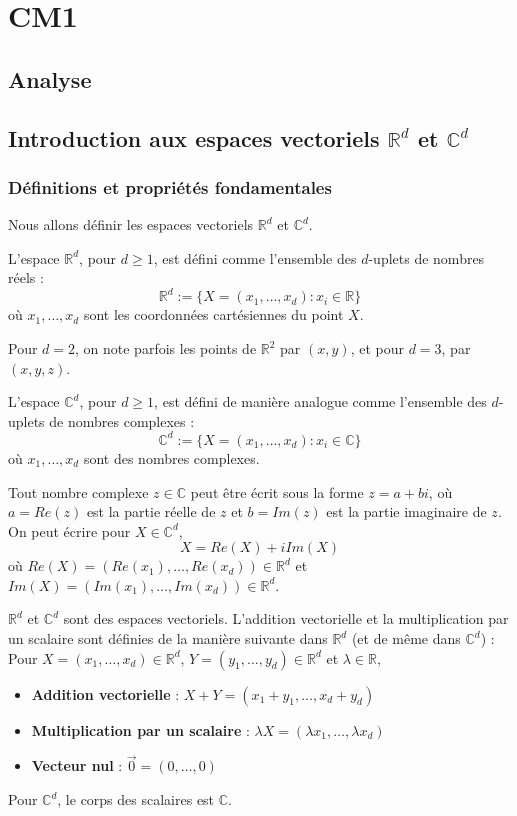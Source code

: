 \documentclass[oneside]{book}
\begin{document}
\sloppy
\chapter{CM1}
\sloppy

\section{Analyse}

\section{Introduction aux espaces vectoriels $\mathbb{R}^d$ et $\mathbb{C}^d$}

\subsection{Définitions et propriétés fondamentales}

Nous allons définir les espaces vectoriels $\mathbb{R}^d$ et $\mathbb{C}^d$.

\begin{definition}
L'espace $\mathbb{R}^d$, pour $d \geq 1$, est défini comme l'ensemble des $d$-uplets de nombres réels :
\[
\mathbb{R}^d := \{X = (x_1, \ldots, x_d) : x_i \in \mathbb{R}\}
\]
où $x_1, \ldots, x_d$ sont les coordonnées cartésiennes du point $X$.
\end{definition}

Pour $d=2$, on note parfois les points de $\mathbb{R}^2$ par $(x, y)$, et pour $d=3$, par $(x, y, z)$.

\begin{definition}
L'espace $\mathbb{C}^d$, pour $d \geq 1$, est défini de manière analogue comme l'ensemble des $d$-uplets de nombres complexes :
\[
\mathbb{C}^d := \{X = (x_1, \ldots, x_d) : x_i \in \mathbb{C}\}
\]
où $x_1, \ldots, x_d$ sont des nombres complexes.
\end{definition}

Tout nombre complexe $z \in \mathbb{C}$ peut être écrit sous la forme $z = a + bi$, où $a = Re(z)$ est la partie réelle de $z$ et $b = Im(z)$ est la partie imaginaire de $z$. On peut écrire pour $X \in \mathbb{C}^d$,
\[
X = Re(X) + i Im(X)
\]
où $Re(X) = (Re(x_1), \ldots, Re(x_d)) \in \mathbb{R}^d$ et $Im(X) = (Im(x_1), \ldots, Im(x_d)) \in \mathbb{R}^d$.

$\mathbb{R}^d$ et $\mathbb{C}^d$ sont des espaces vectoriels. L'addition vectorielle et la multiplication par un scalaire sont définies de la manière suivante dans $\mathbb{R}^d$ (et de même dans $\mathbb{C}^d$) :
Pour $X = (x_1, \ldots, x_d) \in \mathbb{R}^d$, $Y = (y_1, \ldots, y_d) \in \mathbb{R}^d$ et $\lambda \in \mathbb{R}$,
\begin{itemize}
    \item \textbf{Addition vectorielle} : $X + Y = (x_1 + y_1, \ldots, x_d + y_d)$
    \item \textbf{Multiplication par un scalaire} : $\lambda X = (\lambda x_1, \ldots, \lambda x_d)$
    \item \textbf{Vecteur nul} : $\overrightarrow{0} = (0, \ldots, 0)$
\end{itemize}
Pour $\mathbb{C}^d$, le corps des scalaires est $\mathbb{C}$.
\end{document}
